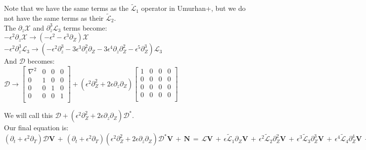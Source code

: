 \documentclass[letterpaper,12pt]{article}
\begin{document}
Note that we have the same terms as the $\widetilde{\mathcal{L}}_1$ operator in Umurhan+, but we do not have the same terms as their $\widetilde{\mathcal{L}}_2$. \\

The $\partial_z\mathcal{X}$ and $\partial_z^3\mathcal{L}_3$ terms become: \\

$-\epsilon^2\partial_z\mathcal{X} \to \left(-\epsilon^2 - \epsilon^3\partial_Z\right)\mathcal{X}$ \\

$-\epsilon^2\partial_z^3\mathcal{L}_3 \to \left(-\epsilon^2\partial_z^3 - 3\epsilon^3\partial_z^2\partial_Z - 3\epsilon^4\partial_z\partial_Z^2 - \epsilon^5\partial_Z^3\right)\mathcal{L}_3$ \\

And $\mathcal{D}$ becomes: \\

$\mathcal{D} \to \left[\begin{matrix}
\nabla^2 & 0 & 0 & 0 \\
0 & 1& 0 & 0 \\
0 & 0 & 1 & 0\\
0 & 0 & 0 & 1 \\
\end{matrix}\right] + \left(\epsilon^2\partial_Z^2 + 2\epsilon\partial_z\partial_Z\right)\left[\begin{matrix}
1 & 0 & 0 & 0 \\
0 & 0 & 0 & 0 \\
0 & 0 & 0 & 0 \\
0 & 0 & 0 & 0 \\ \end{matrix}\right]$ \\

\vspace{2mm}

We will call this $\mathcal{D} + \left(\epsilon^2\partial_Z^2 + 2\epsilon\partial_z\partial_Z\right)\mathcal{D^*}$. \\

Our final equation is: \\

$\left(\partial_t + \epsilon^2 \partial_T \right)\mathcal{D}\mathbf{V} \, + \, \left(\partial_t + \epsilon^2\partial_T\right)\left(\epsilon^2\partial_Z^2 + 2\epsilon\partial_z\partial_Z\right)\mathcal{D^*}\mathbf{V} \, + \, \mathbf{N} \, = \, \mathcal{L}\mathbf{V} \, + \, \epsilon\widetilde{\mathcal{L}}_1\partial_Z\mathbf{V} \, + \, \epsilon^2\widetilde{\mathcal{L}}_2\partial_Z^2\mathbf{V} \, + \, \epsilon^3\widetilde{\mathcal{L}}_3\partial_Z^3\mathbf{V} \, + \, \epsilon^4\widetilde{\mathcal{L}}_4\partial_Z^4\mathbf{V} \, - \, \epsilon^2\partial_z\mathcal{X}\mathbf{V} \, - \epsilon^3\partial_Z\mathcal{X}\mathbf{V} \, - \, \epsilon^2\partial_z^3\mathcal{L}_3\mathbf{V} \, - \, 3\epsilon^3\partial_z^2\partial_Z\mathcal{L}_3\mathbf{V} \, - \, 3\epsilon^4\partial_z\partial_Z^2\mathcal{L}_3\mathbf{V} \, - \, \epsilon^5\partial_Z^3\mathcal{L}_3\mathbf{V}$ \\
\end{document}
